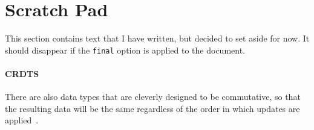 \section*{Scratch Pad}

This section contains text that I have written, but decided to set aside for now.
It should disappear if the \lstinline{final} option is applied to the document.

\paragraph{CRDTS}
There are also data types that are cleverly designed to be commutative, so that the resulting data will be the same regardless of the order in which updates are applied~\cite{crdt_orig}.
